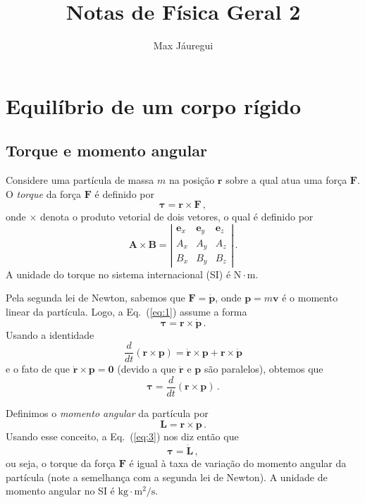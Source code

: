 \documentclass[twocolumn=on,DIV=calc]{scrartcl}
\title{Notas de Física Geral 2}
\author{Max Jáuregui}
\begin{document}
\maketitle
\tableofcontents

\section{Equilíbrio de um corpo rígido}

\subsection{Torque e momento angular}

Considere uma partícula de massa $m$ na posição $\mathbf{r}$ sobre a qual atua uma
força $\mathbf{F}$. O \textit{torque} da força $\mathbf{F}$ é definido
por
\begin{equation}
  \label{eq:1}
  \boldsymbol{\tau}=\mathbf{r}\times\mathbf{F}\,,
\end{equation}
onde $\times$ denota o produto vetorial de dois vetores, o qual é
definido por
$$\mathbf{A}\times\mathbf{B}=
\left|
  \begin{array}{ccc}
    \mathbf{e}_x&\mathbf{e}_y&\mathbf{e}_z\\
    A_x&A_y&A_z\\
    B_x&B_y&B_z
  \end{array}
\right|\,.$$
A unidade do torque no sistema internacional (SI) é $\mathrm{N}\cdot\mathrm{m}$.

Pela segunda lei de Newton, sabemos que $\mathbf{F}=\dot{\mathbf{p}}$,
onde $\mathbf{p}=m\mathbf{v}$ é o momento linear da partícula. Logo, a
Eq.~(\ref{eq:1}) assume a forma
$$\boldsymbol{\tau}=\mathbf{r}\times\dot{\mathbf{p}}\,.$$
Usando a identidade
\begin{equation}
  \label{eq:2}
  \frac{d}{dt}(\mathbf{r}\times\mathbf{p})=\dot{\mathbf{r}}\times\mathbf{p}+\mathbf{r}\times\dot{\mathbf{p}}
\end{equation}
e o fato de que $\dot{\mathbf{r}}\times\mathbf{p}=\mathbf{0}$ (devido
a que $\dot{\mathbf{r}}$ e $\mathbf{p}$ são paralelos), obtemos que
\begin{equation}
  \label{eq:3}
  \boldsymbol{\tau}=\frac{d}{dt}(\mathbf{r}\times\mathbf{p})\,.
\end{equation}

Definimos o \textit{momento angular} da partícula por
$$\mathbf{L}=\mathbf{r}\times\mathbf{p}\,.$$
Usando esse conceito, a Eq.~(\ref{eq:3}) nos diz então que
\begin{equation}
  \label{eq:4}
  \boldsymbol{\tau}=\dot{\mathbf{L}}\,,
\end{equation}
ou seja, o torque da força $\mathbf{F}$ é igual à taxa de variação do
momento angular da partícula (note a semelhança com a segunda lei de
Newton). A unidade de momento angular no SI é $\mathrm{kg}\cdot\mathrm{m^2/s}$.
\end{document}
